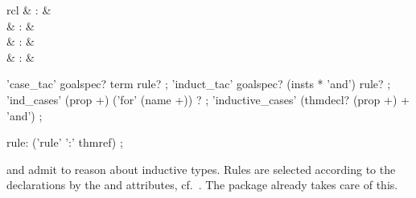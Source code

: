 \begin{isabellebody}
\begin{isamarkuptext}
  \begin{matharray}{rcl}
    \hypertarget{method.HOL.case-tac}{\hyperlink{method.HOL.case-tac}{\mbox{}}} & : &  \\
    \hypertarget{method.HOL.induct-tac}{\hyperlink{method.HOL.induct-tac}{\mbox{}}} & : &  \\
    \hypertarget{method.HOL.ind-cases}{\hyperlink{method.HOL.ind-cases}{\mbox{}}} & : &  \\
    \hypertarget{command.HOL.inductive-cases}{\hyperlink{command.HOL.inductive-cases}{\mbox{}}} & : &  \\
  \end{matharray}

  \begin{rail}
    'case_tac' goalspec? term rule?
    ;
    'induct_tac' goalspec? (insts * 'and') rule?
    ;
    'ind_cases' (prop +) ('for' (name +)) ?
    ;
    'inductive_cases' (thmdecl? (prop +) + 'and')
    ;

    rule: ('rule' ':' thmref)
    ;
  \end{rail}

  \begin{description}

  \item \hyperlink{method.HOL.case-tac}{\mbox{}} and \hyperlink{method.HOL.induct-tac}{\mbox{}} admit
  to reason about inductive types.  Rules are selected according to
  the declarations by the \hyperlink{attribute.cases}{\mbox{}} and \hyperlink{attribute.induct}{\mbox{}}
  attributes, cf.\ .  The \hyperlink{command.HOL.datatype}{\mbox{}} package already takes care of this.


\end{description}
\end{isamarkuptext}
\end{isabellebody}
